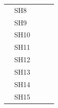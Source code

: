 \documentclass[]{book}
\begin{document}
\begin{table}[ht]
\begin{tabular}{|l|l|l|l|l|}
        & SH8                                   &                                    &                                                        &                                                                                                                                         \\ \cline{2-2}
        & SH9                                   &                                    &                                                        &                                                                                                                                         \\ \cline{2-2}
        & SH10                                  &                                    &                                                        &                                                                                                                                         \\ \cline{2-2}
        & SH11                                  &                                    &                                                        &                                                                                                                                         \\ \cline{2-2}
        & SH12                                  &                                    &                                                        &                                                                                                                                         \\ \cline{2-2}
        & SH13                                  &                                    &                                                        &                                                                                                                                         \\ \cline{2-2}
        & SH14                                  &                                    &                                                        &                                                                                                                                         \\ \cline{2-2}
        & SH15                                  &                                    &                                                        &                                                                                                                                         \\ \cline{2-2}

\end{tabular}
\end{table}
\end{document}
